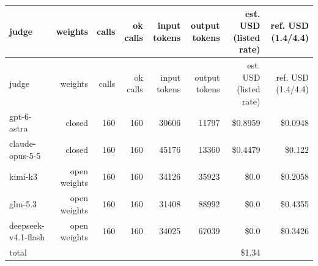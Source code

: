 \begin{longtable}{lrrrrrrr}
\toprule
judge & weights & calls & ok calls & input tokens & output tokens & est. USD (listed rate) & ref. USD (1.4/4.4) \\
\midrule
\endfirsthead
\toprule
judge & weights & calls & ok calls & input tokens & output tokens & est. USD (listed rate) & ref. USD (1.4/4.4) \\
\midrule
\endhead
gpt-6-astra & closed & 160 & 160 & 30606 & 11797 & \$0.8959 & \$0.0948 \\
claude-opus-5-5 & closed & 160 & 160 & 45176 & 13360 & \$0.4479 & \$0.122 \\
kimi-k3 & open weights & 160 & 160 & 34126 & 35923 & \$0.0 & \$0.2058 \\
glm-5.3 & open weights & 160 & 160 & 31408 & 88992 & \$0.0 & \$0.4355 \\
deepseek-v4.1-flash & open weights & 160 & 160 & 34025 & 67039 & \$0.0 & \$0.3426 \\
total &  &  &  &  &  & \$1.34 &  \\
\bottomrule
\end{longtable}
